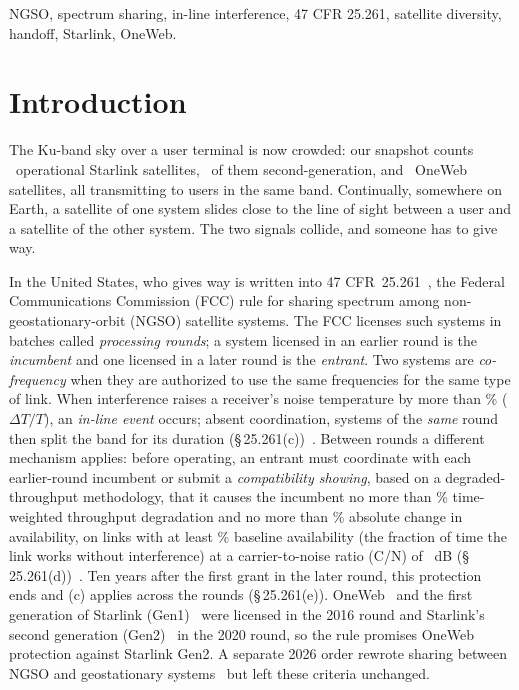 \documentclass[conference]{IEEEtran}
\begin{document}
\begin{IEEEkeywords}
NGSO, spectrum sharing, in-line interference, 47 CFR 25.261, satellite
diversity, handoff, Starlink, OneWeb.
\end{IEEEkeywords}

\section{Introduction}
The Ku-band sky over a user terminal is now crowded: our snapshot counts
\NStarlinkOperational\ operational Starlink satellites, \NStarlinkGenTwo\ of them
second-generation, and \NOnewebOp\ OneWeb satellites, all transmitting to users
in the same band. Continually, somewhere on Earth, a satellite of one system
slides close to the line of sight between a user and a satellite of the other
system. The two signals collide, and someone has to give way.

In the United States, who gives way is written into 47 CFR~25.261~\cite{cfr25261},
the Federal Communications Commission (FCC) rule for sharing spectrum among
non-geostationary-orbit (NGSO) satellite systems. The FCC licenses such systems
in batches called \emph{processing rounds}; a system licensed in an earlier round
is the \emph{incumbent} and one licensed in a later round is the \emph{entrant}.
Two systems are \emph{co-frequency} when they are authorized to use the same
frequencies for the same type of link. When interference raises a receiver's
noise temperature by more than \DttThresholdPct\% ($\Delta T/T$), an
\emph{in-line event} occurs; absent coordination, systems of the \emph{same}
round then split the band for its duration (\S\,25.261(c))~\cite{cfr25261,fcc2329}.
Between rounds a different mechanism applies: before operating, an entrant must
coordinate with each earlier-round incumbent or submit a \emph{compatibility
showing}, based on a degraded-throughput methodology, that it causes the
incumbent no more than \DegradeLimitPct\% time-weighted throughput degradation
and no more than \UnavailLimitPct\% absolute change in availability, on links
with at least \RuleBaselineAvailPct\% baseline availability (the fraction of time
the link works without interference) at a carrier-to-noise ratio (C/N) of
\CnGateDb~dB (\S\,25.261(d))~\cite{cfr25261,fcc24117}. Ten years after the
first grant in the later round, this protection ends and (c) applies across the
rounds (\S\,25.261(e)). OneWeb~\cite{fcc1777} and the first generation of
Starlink (Gen1)~\cite{fcc1838} were licensed in the 2016 round and Starlink's
second generation (Gen2)~\cite{fcc2291} in the 2020 round, so the rule promises
OneWeb protection against Starlink Gen2. A separate 2026 order rewrote sharing
between NGSO and geostationary systems~\cite{fcc2626} but left these criteria
unchanged.
\end{document}
